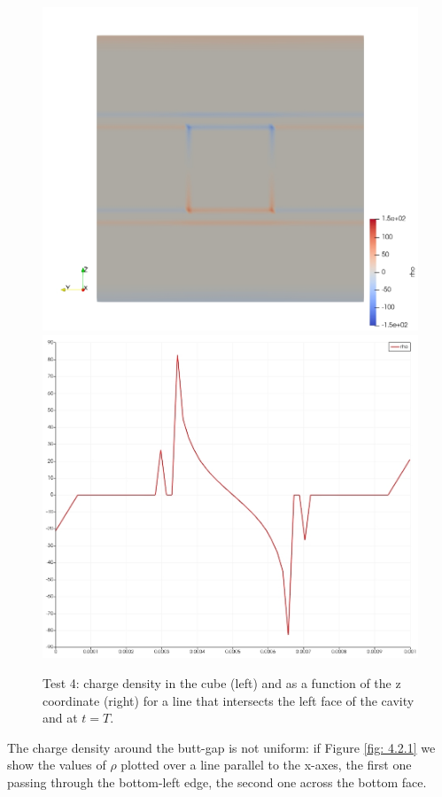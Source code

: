 \documentclass{Configuration_Files/PoliMi3i_thesis}
\begin{document}
\begin{figure}[h!]
    \centering
   \includegraphics[scale=0.2]{Images/4.rho_3d.jpeg}
   \includegraphics[scale=0.2]{Images/4.rho_new.jpeg}
    \caption {Test 4: charge density in the cube (left) and as a function of the z coordinate (right) for a line that intersects the left face of the cavity and at $t=T$.}
    \label{fig: 4.2}
\end{figure}
The charge density around the butt-gap is not uniform: if Figure \ref{fig: 4.2.1} we show the values of $\rho$ plotted over a line parallel to the x-axes, the first one passing through the bottom-left edge, the second one across the bottom face.
\end{document}
